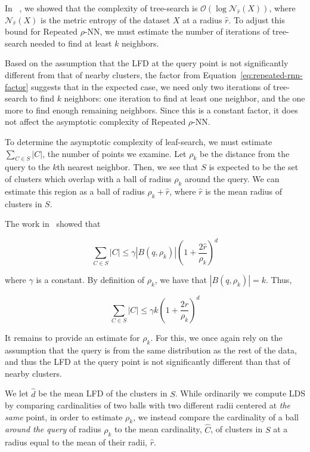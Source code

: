 In ~\cite{ishaq2019clustered}, we showed that the complexity of tree-search is $\mathcal{O}(\log\mathcal{N}_{\hat{r}}(X))$, where $\mathcal{N}_{\hat{r}}(X)$ is the metric entropy of the dataset $X$ at a radius $\hat{r}$.
To adjust this bound for Repeated $\rho$-NN, we must estimate the number of iterations of tree-search needed to find at least $k$ neighbors.

Based on the assumption that the LFD at the query point is not significantly different from that of nearby clusters, the factor from Equation~\ref{eq:repeated-rnn-factor} suggests that in the expected case, we need only two iterations of tree-search to find $k$ neighbors:
one iteration to find at least one neighbor, and the one more to find enough remaining neighbors.
Since this is a constant factor, it does not affect the asymptotic complexity of Repeated $\rho$-NN.

To determine the asymptotic complexity of leaf-search, we must estimate $\sum_{C \in S} |C|$, the number of points we examine.
Let $\rho_k$ be the distance from the query to the $k$th nearest neighbor.
Then, we see that $S$ is expected to be the set of clusters which overlap with a ball of radius $\rho_k$ around the query.
We can estimate this region as a ball of radius $\rho_k + \hat{r}$, where $\hat{r}$ is the mean radius of clusters in $S$.

The work in~\cite{yu2015entropy} showed that

\begin{equation*}
    \sum_{C \in S} |C| \leq \gamma  \left| B(q, \rho_k) \right| \left(1+ \frac{2\hat{r}}{\rho_k} \right)^d
\end{equation*}

where $\gamma$ is a constant. 
By definition of $\rho_k$, we have that $|B(q, \rho_k)| = k$.
Thus,

\begin{equation}
    \sum_{C \in S} |C| \leq \gamma k \left( 1+ \frac{2\hat{r}}{\rho_k} \right)^d
    \label{eq:methods:repeated-rnn-leaf-search}
\end{equation}

It remains to provide an estimate for $\rho_k$. 
For this, we once again rely on the assumption that the query is from the same distribution as the rest of the data, and thus the LFD at the query point is not significantly different than that of nearby clusters.

We let $\hat{d}$ be the mean LFD of the clusters in $S$.
While ordinarily we compute LDS by comparing cardinalities of two balls with two different radii centered at \emph{the same} point, in order to estimate $\rho_k$, we instead compare the cardinality of a ball \emph{around the query} of radius $\rho_k$ to the mean cardinality, $\hat{C}$, of clusters in $S$ at a radius equal to the mean of their radii, $\hat{r}$.

